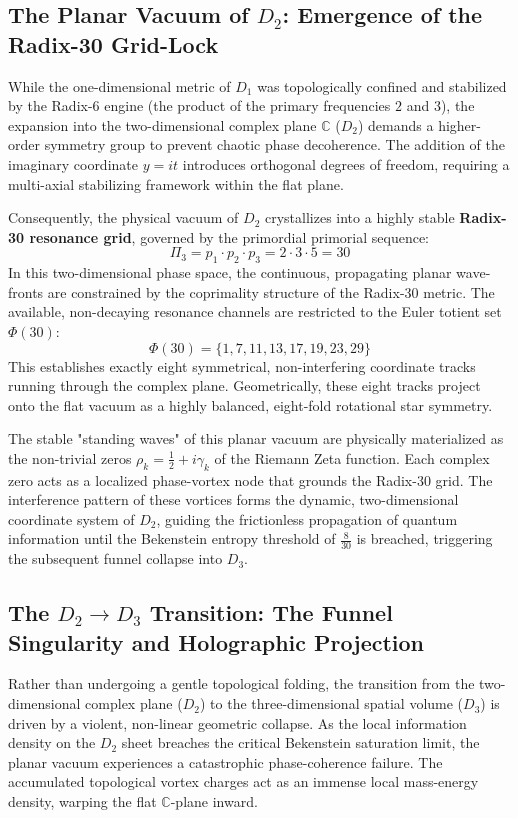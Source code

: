 \documentclass[11pt,a4paper]{article}
\theoremstyle{plain}
\theoremstyle{definition}
\theoremstyle{remark}
\begin{document}
\subsection{The Planar Vacuum of $D_2$: Emergence of the Radix-30 Grid-Lock}
While the one-dimensional metric of $D_1$ was topologically confined and stabilized by the Radix-6 engine (the product of the primary frequencies $2$ and $3$), the expansion into the two-dimensional complex plane $\mathbb{C}$ ($D_2$) demands a higher-order symmetry group to prevent chaotic phase decoherence. The addition of the imaginary coordinate $y = it$ introduces orthogonal degrees of freedom, requiring a multi-axial stabilizing framework within the flat plane.

Consequently, the physical vacuum of $D_2$ crystallizes into a highly stable \textbf{Radix-30 resonance grid}, governed by the primordial primorial sequence:
\begin{equation}
\Pi_3 = p_1 \cdot p_2 \cdot p_3 = 2 \cdot 3 \cdot 5 = 30
\end{equation}
In this two-dimensional phase space, the continuous, propagating planar wave-fronts are constrained by the coprimality structure of the Radix-30 metric. The available, non-decaying resonance channels are restricted to the Euler totient set $\Phi(30)$:
\begin{equation}
\Phi(30) = \{1, 7, 11, 13, 17, 19, 23, 29\}
\end{equation}
This establishes exactly eight symmetrical, non-interfering coordinate tracks running through the complex plane. Geometrically, these eight tracks project onto the flat vacuum as a highly balanced, eight-fold rotational star symmetry. 

The stable "standing waves" of this planar vacuum are physically materialized as the non-trivial zeros $\rho_k = \frac{1}{2} + i\gamma_k$ of the Riemann Zeta function. Each complex zero acts as a localized phase-vortex node that grounds the Radix-30 grid. The interference pattern of these vortices forms the dynamic, two-dimensional coordinate system of $D_2$, guiding the frictionless propagation of quantum information until the Bekenstein entropy threshold of $\frac{8}{30}$ is breached, triggering the subsequent funnel collapse into $D_3$.
\newpage
\subsection{The $D_2 \to D_3$ Transition: The Funnel Singularity and Holographic Projection}
Rather than undergoing a gentle topological folding, the transition from the two-dimensional complex plane ($D_2$) to the three-dimensional spatial volume ($D_3$) is driven by a violent, non-linear geometric collapse. As the local information density on the $D_2$ sheet breaches the critical Bekenstein saturation limit, the planar vacuum experiences a catastrophic phase-coherence failure. The accumulated topological vortex charges act as an immense local mass-energy density, warping the flat $\mathbb{C}$-plane inward.
\end{document}
